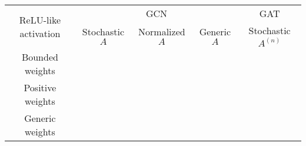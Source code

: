 \begin{tabular}{c|c c c|c}
        \toprule
        \multirow{2}{*}{ReLU-like activation} & \multicolumn{3}{c|}{GCN} & \multicolumn{1}{c}{GAT} \\
        \cmidrule(lr){2-4} \cmidrule(lr){5-5}
        & Stochastic $A$ & Normalized $A$ & Generic $A$ & Stochastic $A^{(n)}$ \\ 
        \midrule
        Bounded weights & & \makecell{\cite{caiNoteOversmoothingGraph2020} \\ \cite{oonoGraphNeuralNetworks2019}} & & \cite{wuDemystifyingOversmoothingAttentionbased2023}\\
        Positive weights & & & & \\
        Generic weights & & & & \\
        \bottomrule
    \end{tabular}